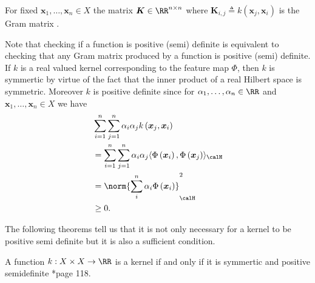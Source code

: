\begin{defe} \label{defe: Gram_Matrix}
    For fixed $\bm{x}_1 ,\ldots , \bm{x}_n \in X$ the matrix $\bm{K} \in \RR^{n \times n}$ where $\bm{K}_{i,j} \triangleq k \left( \bm{x}_j , \bm{x}_i \right)$ is the Gram matrix \cite{SteinwartIngo2008SVMb}.
\end{defe}

Note that checking if a function is positive (semi) definite is equivalent to checking that any Gram matrix produced by a function is positive (semi) definite. If $k$ is a real valued kernel corresponding to the feature map $\Phi$, then $k$ is symmertic by virtue of the fact that the inner product of a real Hilbert space is symmetric. Moreover $k$ is positive definite since for $\alpha_1 , \ldots , \alpha_n \in \RR$ and $\bm{x}_1 ,\ldots , \bm{x}_n \in X$ we have
\begin{align*}
     & \sum_{i=1}^{n} \sum_{j=1}^{n} \alpha_i \alpha_j k \left( \bm{x}_j , \bm{x}_i \right)                                                 \\
     & = \sum_{i=1}^{n} \sum_{j=1}^{n} \alpha_i \alpha_j \langle \Phi \left( \bm{x}_i \right), \Phi \left( \bm{x}_j \right) \rangle_{\calH} \\
     & = \norm{ \sum_i^n \alpha_i \Phi \left( \bm{x}_i \right) }_{\calH}^{2}                                                                \\
     & \geq 0.
\end{align*}

The following theorems tell us that it is not only necessary for a kernel to be positive semi definite but it is also a sufficient condition.

\begin{thm} \label{theorem: nec_and_suf_kernel_1}
    A function $k : X \times X \to \RR$ is a kernel if and only if it is symmertic and positive semidefinite \cite{SteinwartIngo2008SVMb}*{page 118}.
\end{thm}

